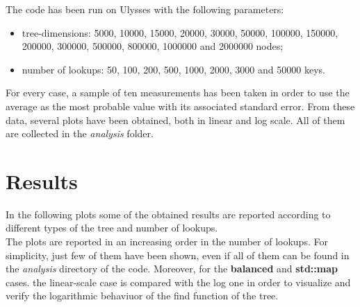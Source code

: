 \documentclass[a4paper,12pt,oneside]{article}
\begin{document}
The code has been run on Ulysses with the following parameters:
\begin{itemize}
\item tree-dimensions: 5000, 10000, 15000, 20000, 30000, 50000, 100000, 150000, 200000, 300000, 500000, 800000, 1000000 and 2000000 nodes;
\item number of lookups: 50, 100, 200, 500, 1000, 2000, 3000 and 50000 keys.
\end{itemize}

For every case, a sample of ten measurements has been taken in order to use the average as the most probable value with its associated standard error. From these data, several plots have been obtained, both in linear and log scale. All of them are collected in the \textit{analysis} folder.

\section{Results}
In the following plots some of the obtained results are reported according to different types of the tree and number of lookups.\\
The plots are reported in an increasing order in the number of lookups. For simplicity, just few of them have been shown, even if all of them can be found in the \textit{analysis} directory of the code. Moreover, for the \textbf{balanced} and \textbf{std::map} cases. the linear-scale case is compared with the log one in order to visualize and verify the logarithmic behaviuor of the find function of the tree.\\

\vspace{2.5cm}


\end{document}
